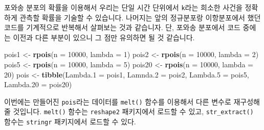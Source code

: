 \documentclass[]{book}
\newenvironment{Shaded}{\begin{snugshade}}{\end{snugshade}}
\newcommand{\CharTok}[1]{\textcolor[rgb]{0.31,0.60,0.02}{#1}}
\newcommand{\DataTypeTok}[1]{\textcolor[rgb]{0.13,0.29,0.53}{#1}}
\newcommand{\DecValTok}[1]{\textcolor[rgb]{0.00,0.00,0.81}{#1}}
\newcommand{\KeywordTok}[1]{\textcolor[rgb]{0.13,0.29,0.53}{\textbf{#1}}}
\newcommand{\NormalTok}[1]{#1}
\newcommand{\OperatorTok}[1]{\textcolor[rgb]{0.81,0.36,0.00}{\textbf{#1}}}
\newcommand{\StringTok}[1]{\textcolor[rgb]{0.31,0.60,0.02}{#1}}
\begin{document}
포와송 분포의 확률을 이용해서 우리는 단일 시간 단위에서 \texttt{k}라는 희소한 사건을 정확하게 관측할 확률을 기술할 수 있습니다. 나머지는 앞의 정규분포랑 이항분포에서 했던 코드를 기계적으로 반복해서 살펴보는 것과 같습니자. 단, 포와송 분포에서 코드 중에는 이전과 다른 부분이 있으니 그 점만 유의하면 될 것 같습니다.

\begin{Shaded}
\begin{Highlighting}[]
\NormalTok{pois1 <-}\StringTok{ }\KeywordTok{rpois}\NormalTok{(}\DataTypeTok{n =} \DecValTok{10000}\NormalTok{, }\DataTypeTok{lambda =} \DecValTok{1}\NormalTok{)}
\NormalTok{pois2 <-}\StringTok{ }\KeywordTok{rpois}\NormalTok{(}\DataTypeTok{n =} \DecValTok{10000}\NormalTok{, }\DataTypeTok{lambda =} \DecValTok{2}\NormalTok{)}
\NormalTok{pois5 <-}\StringTok{ }\KeywordTok{rpois}\NormalTok{(}\DataTypeTok{n =} \DecValTok{10000}\NormalTok{, }\DataTypeTok{lambda =} \DecValTok{5}\NormalTok{)}
\NormalTok{pois20 <-}\StringTok{ }\KeywordTok{rpois}\NormalTok{(}\DataTypeTok{n =} \DecValTok{10000}\NormalTok{, }\DataTypeTok{lambda =} \DecValTok{20}\NormalTok{)}
\NormalTok{pois <-}\StringTok{ }\KeywordTok{tibble}\NormalTok{(}\DataTypeTok{Lambda.1 =}\NormalTok{ pois1, }
               \DataTypeTok{Lamnda.2 =}\NormalTok{ pois2,}
               \DataTypeTok{Lambda.5 =}\NormalTok{ pois5,}
               \DataTypeTok{Lambda.20 =}\NormalTok{ pois20)}
\end{Highlighting}
\end{Shaded}

이번에는 만들어진 \texttt{pois}라는 데이터를 \texttt{melt()} 함수를 이용해서 다른 변수로 재구성해줄 것입니다. \texttt{melt()} 함수는 \texttt{reshape2} 패키지에서 로드할 수 있고, \texttt{str\_extract()} 함수는 \texttt{stringr} 패키지에서 로드할 수 있다.

\begin{Shaded}
\end{Shaded}
\end{document}
